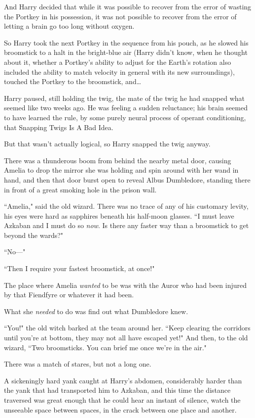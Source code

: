 And Harry decided that while it was possible to recover from the error of wasting the Portkey in his possession, it was not possible to recover from the error of letting a brain go too long without oxygen.

So Harry took the next Portkey in the sequence from his pouch, as he slowed his broomstick to a halt in the bright-blue air (Harry didn't know, when he thought about it, whether a Portkey's ability to adjust for the Earth's rotation also included the ability to match velocity in general with its new surroundings), touched the Portkey to the broomstick, and{\ldots}

Harry paused, still holding the twig, the mate of the twig he had snapped what seemed like two weeks ago. He was feeling a sudden reluctance; his brain seemed to have learned the rule, by some purely neural process of operant conditioning, that Snapping Twigs Is A Bad Idea.

But that wasn't actually logical, so Harry snapped the twig anyway.

\later

There was a thunderous boom from behind the nearby metal door, causing Amelia to drop the mirror she was holding and spin around with her wand in hand, and then that door burst open to reveal Albus Dumbledore, standing there in front of a great smoking hole in the prison wall.

``Amelia," said the old wizard. There was no trace of any of his customary levity, his eyes were hard as sapphires beneath his half-moon glasses. ``I must leave Azkaban and I must do so \emph{now}. Is there any faster way than a broomstick to get beyond the wards?"

``No—"

``Then I require your fastest broomstick, at once!"

The place where Amelia \emph{wanted} to be was with the Auror who had been injured by that Fiendfyre or whatever it had been.

What she \emph{needed} to do was find out what Dumbledore knew.

``You!" the old witch barked at the team around her. ``Keep clearing the corridors until you're at bottom, they may not all have escaped yet!" And then, to the old wizard, ``Two broomsticks. You can brief me once we're in the air."

There was a match of stares, but not a long one.

\later

A sickeningly hard yank caught at Harry's abdomen, considerably harder than the yank that had transported him to Azkaban, and this time the distance traversed was great enough that he could hear an instant of silence, watch the unseeable space between spaces, in the crack between one place and another.

